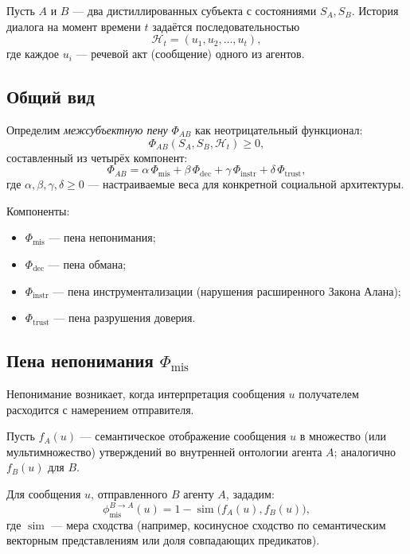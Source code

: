 \documentclass[11pt,a4paper]{article}
\begin{document}
Пусть \(A\) и \(B\) — два дистиллированных субъекта с состояниями
\(S_A, S_B\). История диалога на момент времени \(t\) задаётся
последовательностью
\[
  \mathcal{H}_t = (u_1, u_2, \dots, u_t),
\]
где каждое \(u_i\) — речевой акт (сообщение) одного из агентов.

\subsection{Общий вид}

Определим \emph{межсубъектную пену} \(\Phi_{AB}\) как неотрицательный
функционал:
\[
  \Phi_{AB}(S_A, S_B, \mathcal{H}_t) \ge 0,
\]
составленный из четырёх компонент:
\[
  \Phi_{AB} =
  \alpha \,\Phi_{\text{mis}} +
  \beta  \,\Phi_{\text{dec}} +
  \gamma \,\Phi_{\text{instr}} +
  \delta \,\Phi_{\text{trust}},
\]
где \(\alpha, \beta, \gamma, \delta \ge 0\) — настраиваемые веса
для конкретной социальной архитектуры.

Компоненты:

\begin{itemize}
  \item \(\Phi_{\text{mis}}\) — пена непонимания;
  \item \(\Phi_{\text{dec}}\) — пена обмана;
  \item \(\Phi_{\text{instr}}\) — пена инструментализации
        (нарушения расширенного Закона Алана);
  \item \(\Phi_{\text{trust}}\) — пена разрушения доверия.
\end{itemize}

\subsection{Пена непонимания \texorpdfstring{\(\Phi_{\text{mis}}\)}{Φ\_mis}}

Непонимание возникает, когда интерпретация сообщения \(u\) получателем
расходится с намерением отправителя.

Пусть \(f_A(u)\) — семантическое отображение сообщения \(u\) в
множество (или мультимножество) утверждений во внутренней онтологии
агента \(A\); аналогично \(f_B(u)\) для \(B\).

Для сообщения \(u\), отправленного \(B\) агенту \(A\), зададим:
\[
  \phi_{\text{mis}}^{B\to A}(u) =
  1 - \operatorname{sim}\bigl(f_A(u), f_B(u)\bigr),
\]
где \(\operatorname{sim}\) — мера сходства
(например, косинусное сходство по семантическим векторным
представлениям или доля совпадающих предикатов).
\end{document}
